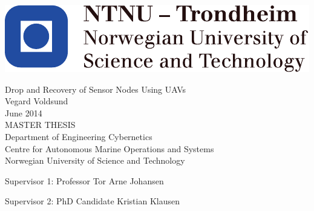 \thispagestyle{empty}
\includegraphics[scale=0.8]{fig/NTNU}
\mbox{}\\[2pc]
\begin{center}
\Huge{Drop and Recovery of Sensor Nodes Using UAVs}\\[3pc]

\Large{Vegard Voldsund}\\[1pc]
\large{June 2014}\\[4pc]

MASTER THESIS\\
Department of Engineering Cybernetics\\
Centre for Autonomous Marine Operations and Systems\\
Norwegian University of Science and Technology
\end{center}
\vfill

\noindent Supervisor 1: Professor Tor Arne Johansen 

\noindent Supervisor 2: PhD Candidate Kristian Klausen

